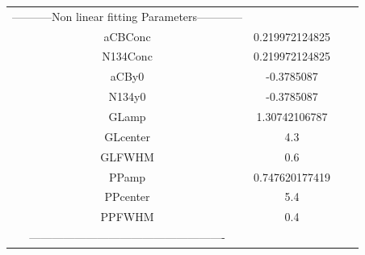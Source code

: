 \documentclass{article}
\begin{document}
\begin{tabular}{c c c c}

-----------Non linear fitting Parameters------------\\
aCBConc    &0.219972124825\\
N134Conc   &0.219972124825\\
aCBy0      &-0.3785087\\
N134y0     &-0.3785087\\
GLamp      &1.30742106787\\
GLcenter   &4.3\\
GLFWHM     &0.6\\
PPamp      &0.747620177419\\
PPcenter   &5.4\\
PPFWHM     &0.4\\
----------------------------------------------------\\


\end{tabular}
\end{document}
